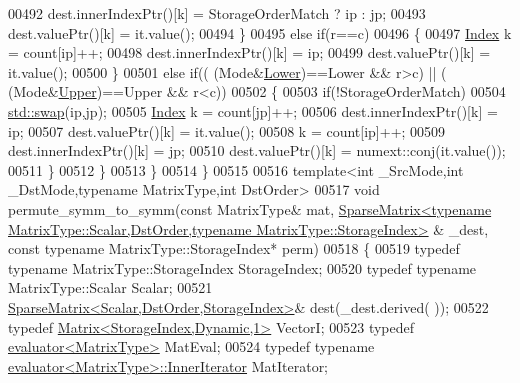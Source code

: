 \begin{DoxyCode}
00492         dest.innerIndexPtr()[k] = StorageOrderMatch ? ip : jp;
00493         dest.valuePtr()[k] = it.value();
00494       \}
00495       \textcolor{keywordflow}{else} \textcolor{keywordflow}{if}(r==c)
00496       \{
00497         \hyperlink{namespace_eigen_a62e77e0933482dafde8fe197d9a2cfde}{Index} k = count[ip]++;
00498         dest.innerIndexPtr()[k] = ip;
00499         dest.valuePtr()[k] = it.value();
00500       \}
00501       \textcolor{keywordflow}{else} \textcolor{keywordflow}{if}(( (Mode&\hyperlink{group__enums_gga39e3366ff5554d731e7dc8bb642f83cda891792b8ed394f7607ab16dd716f60e6}{Lower})==Lower && r>c) || ( (Mode&\hyperlink{group__enums_gga39e3366ff5554d731e7dc8bb642f83cda6bcb58be3b8b8ec84859ce0c5ac0aaec}{Upper})==Upper && r<c))
00502       \{
00503         \textcolor{keywordflow}{if}(!StorageOrderMatch)
00504           \hyperlink{endian_8c_a3ca5ecd34b04d6a243c054ac3a57f68d}{std::swap}(ip,jp);
00505         \hyperlink{namespace_eigen_a62e77e0933482dafde8fe197d9a2cfde}{Index} k = count[jp]++;
00506         dest.innerIndexPtr()[k] = ip;
00507         dest.valuePtr()[k] = it.value();
00508         k = count[ip]++;
00509         dest.innerIndexPtr()[k] = jp;
00510         dest.valuePtr()[k] = numext::conj(it.value());
00511       \}
00512     \}
00513   \}
00514 \}
00515 
00516 \textcolor{keyword}{template}<\textcolor{keywordtype}{int} \_SrcMode,\textcolor{keywordtype}{int} \_DstMode,\textcolor{keyword}{typename} MatrixType,\textcolor{keywordtype}{int} DstOrder>
00517 \textcolor{keywordtype}{void} permute\_symm\_to\_symm(\textcolor{keyword}{const} MatrixType& mat, 
      \hyperlink{group___sparse_core___module_class_eigen_1_1_sparse_matrix}{SparseMatrix<typename MatrixType::Scalar,DstOrder,typename MatrixType::StorageIndex>}
      & \_dest, \textcolor{keyword}{const} \textcolor{keyword}{typename} MatrixType::StorageIndex* perm)
00518 \{
00519   \textcolor{keyword}{typedef} \textcolor{keyword}{typename} MatrixType::StorageIndex StorageIndex;
00520   \textcolor{keyword}{typedef} \textcolor{keyword}{typename} MatrixType::Scalar Scalar;
00521   \hyperlink{group___sparse_core___module_class_eigen_1_1_sparse_matrix}{SparseMatrix<Scalar,DstOrder,StorageIndex>}& dest(\_dest.derived(
      ));
00522   \textcolor{keyword}{typedef} \hyperlink{group___core___module}{Matrix<StorageIndex,Dynamic,1>} VectorI;
00523   \textcolor{keyword}{typedef} \hyperlink{struct_eigen_1_1internal_1_1evaluator}{evaluator<MatrixType>} MatEval;
00524   \textcolor{keyword}{typedef} \textcolor{keyword}{typename} \hyperlink{struct_eigen_1_1internal_1_1evaluator}{evaluator<MatrixType>::InnerIterator} MatIterator;

\end{DoxyCode}
